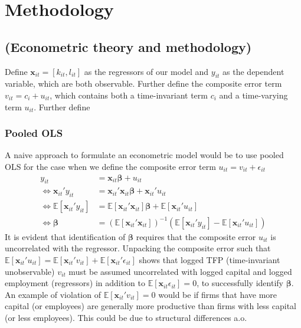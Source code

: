\section{Methodology}

\subsection{(Econometric theory and methodology)}

Define $\pmb{x}_{it}=[k_{it}, l_{it}]$ as the regressors of our model and $y_{it}$ as the dependent variable, which are both observable. Further define the composite error term $v_{it}=c_i+u_{it}$, which contains both a time-invariant term $c_i$ and a time-varying term $u_{it}$. Further define 

\subsubsection*{Pooled OLS}
A naive approach to formulate an econometric model would be to use pooled OLS for the case when we define the composite error term $u_{it}=v_{it}+\epsilon_{it}$
\begin{align*}
    y_{it} &= \pmb{x}_{it} \pmb{\beta}  +u_{it} \\
    \Leftrightarrow \pmb{x}_{it}'y_{it}&=\pmb{x}_{it}'\pmb{x}_{it}\pmb{\beta} +\pmb{x}_{it}'u_{it} \\
    \Leftrightarrow \mathbb{E}[\pmb{x}_{it}'y_{it}] &=\mathbb{E}[\pmb{x}_{it}'\pmb{x}_{it}] \pmb{\beta}  + \mathbb{E}[\pmb{x}_{it}'u_{it}] \\ \Leftrightarrow  \pmb{\beta} &= (\mathbb{E}[\pmb{x}_{it}'\pmb{x}_{it}])^{-1} \left(  \mathbb{E}[\pmb{x}_{it}'y_{it}]-\mathbb{E}[\pmb{x}_{it}' u_{it}]\right)
\end{align*}
It is evident that identification of $\pmb{\beta}$ requires that the composite error $u_{it}$ is uncorrelated with the regressor. Unpacking the composite error such that $\mathbb{E}[\pmb{x}_{it}'u_{it}]=\mathbb{E}[\pmb{x}_{it}'v_{it}]+\mathbb{E}[\pmb{x}_{it}'\epsilon_{it}]$ shows that logged TFP (time-invariant unobservable) $v_{it}$ must be assumed uncorrelated with logged capital and logged employment (regressors) in addition to $\mathbb{E}[\pmb{x}_{it} \epsilon_{it}]=0$, to successfully identify $\pmb{\beta}$. An example of violation of $\mathbb{E}[\pmb{x}_{it}'v_{it}]=0$ would be if firms that have more capital (or employees) are generally more productive than firms with less capital (or less employees). This could be due to structural differences a.o. 

